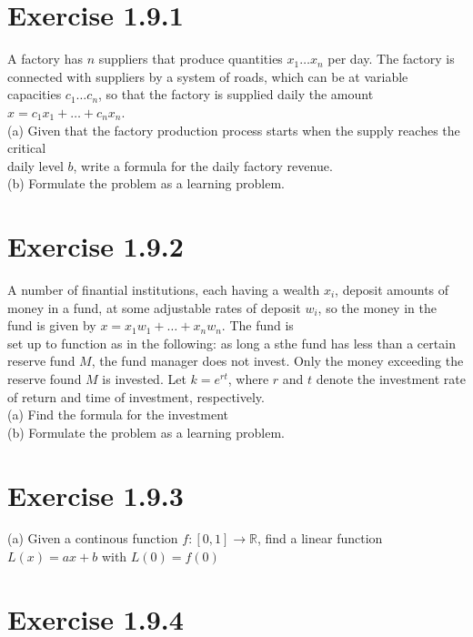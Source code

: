 \documentclass{article}
\begin{document}
\section*{Exercise 1.9.1}


A factory has $n$ suppliers that produce quantities $x_1 \dots x_n$ per day. The factory is connected with suppliers by a system of roads, which
can be at variable capacities $c_1 \dots c_n$, so that the factory is supplied
daily the amount $x = c_1 x_1 + \dots + c_n x_n$.\\
(a) Given that the factory production process starts when the supply reaches the critical \\ 
daily level $b$, write a formula for the daily factory revenue.\\
(b) Formulate the problem as a learning problem.

\section*{Exercise 1.9.2}


A number of finantial institutions, each having a wealth $x_i$, deposit amounts of money in a fund, at some adjustable rates of 
deposit $w_i$, so the money in the fund is given by $x = x_1 w_1 + \dots + x_n w_n$. The fund is \\
set up to function as in the following: as long a sthe fund has less than a certain reserve fund $M$, the fund manager does not invest. Only the
money exceeding the reserve found $M$ is invested. Let $k = e ^ {r t}$, where $r$ and $t$ denote the investment rate of return and time of investment, respectively.\\
(a) Find the formula for the investment \\
(b) Formulate the problem as a learning problem.

\section*{Exercise 1.9.3}


(a) Given a continous function $f: [0,1] \rightarrow \mathbb{R}$, find a linear function $L(x) = ax + b$ with $L(0) = f(0)$
\section*{Exercise 1.9.4}
\end{document}
